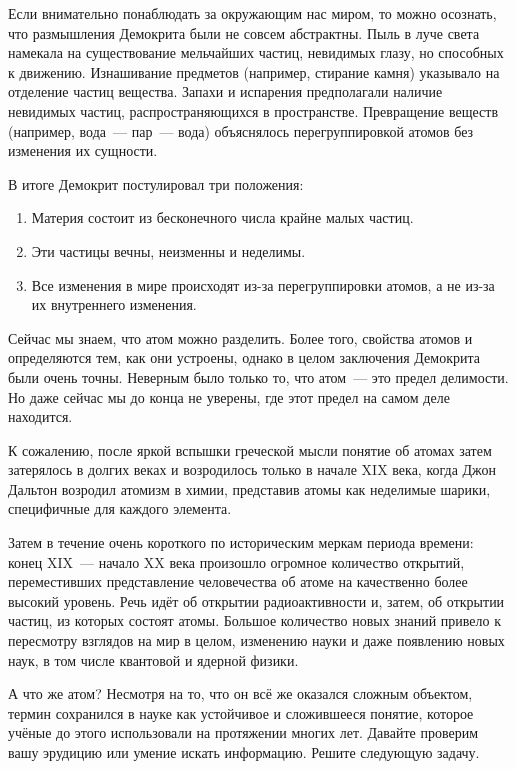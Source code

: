 Если внимательно понаблюдать за окружающим нас миром, то можно осознать, что размышления Демокрита были не совсем абстрактны. Пыль в луче света намекала на существование мельчайших частиц, невидимых глазу, но способных к движению. Изнашивание предметов (например, стирание камня) указывало на отделение частиц вещества. Запахи и испарения предполагали наличие невидимых частиц, распространяющихся в пространстве. Превращение веществ (например, вода~--- пар~--- вода) объяснялось перегруппировкой атомов без изменения их сущности.

В итоге Демокрит постулировал три положения:

\begin{enumerate}[label=\arabic*)]
    \item Материя состоит из бесконечного числа крайне малых частиц.
    \item Эти частицы вечны, неизменны и неделимы.
    \item Все изменения в мире происходят из-за перегруппировки атомов, а не из-за их внутреннего изменения.
\end{enumerate}

Сейчас мы знаем, что атом можно разделить. Более того, свойства атомов и определяются тем, как они устроены, однако в целом заключения Демокрита были очень точны. Неверным было только то, что атом~--- это предел делимости. Но даже сейчас мы до конца не уверены, где этот предел на самом деле находится.

К сожалению, после яркой вспышки греческой мысли понятие об атомах затем затерялось в долгих веках и возродилось только в начале XIX века, когда Джон Дальтон возродил атомизм в химии, представив атомы как неделимые шарики, специфичные для каждого элемента.

Затем в течение очень короткого по историческим меркам периода времени: конец XIX~--- начало XX века произошло огромное количество открытий, переместивших представление человечества об атоме на качественно более высокий уровень. Речь идёт об открытии радиоактивности и, затем, об открытии частиц, из которых состоят атомы. Большое количество новых знаний привело к пересмотру взглядов на мир в целом, изменению науки и даже появлению новых наук, в том числе квантовой и ядерной физики.

А что же атом? Несмотря на то, что он всё же оказался сложным объектом, термин сохранился в науке как устойчивое и сложившееся понятие, которое учёные до этого использовали на протяжении многих лет. Давайте проверим вашу эрудицию или умение искать информацию. Решите следующую задачу.

